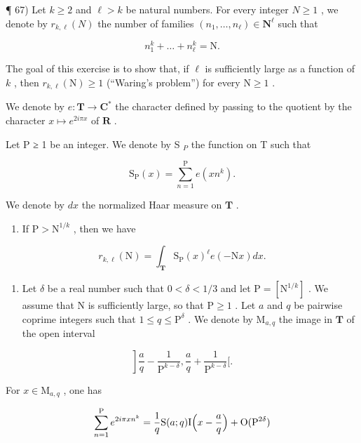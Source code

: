¶ 67) Let \(k \geqslant 2\) and \(\ell > k\) be natural numbers. For every integer \(N \geqslant 1\) , we denote by \(r_{k,\ell}(N)\) the number of families \((n_1, \ldots, n_\ell) \in \mathbf{N}^\ell\) such that

\[
n _ {1} ^ {k} + \dots + n _ {\ell} ^ {k} = \mathrm{N}.
\]

The goal of this exercise is to show that, if \(\ell\) is sufficiently large as a function of \(k\) , then \(r_{k,\ell}(\mathrm{N}) \geqslant 1\) (“Waring's problem”) for every \(\mathrm{N} \geqslant 1\) .

We denote by \(e\colon\mathbf{T}\to\mathbf{C}^{*}\) the character defined by passing to the quotient by the character \(x\mapsto e^{2i\pi x}\) of \(\mathbf{R}\) .

Let P ≥ 1 be an integer. We denote by S \(_{P}\) the function on T such that

\[
\mathrm{S} _ {\mathrm{P}} (x) = \sum_ {n = 1} ^ {\mathrm{P}} e (x n ^ {k}).
\]

We denote by \(dx\) the normalized Haar measure on \(\mathbf{T}\) .

\begin{enumerate}
\def\labelenumi{\alph{enumi})}
\tightlist
\item
  If \(\mathrm{P} > \mathrm{N}^{1 / k}\) , then we have
\end{enumerate}

\[
r _ {k, \ell} (\mathrm{N}) = \int_ {\mathbf {T}} \mathrm{S} _ {\mathrm{P}} (x) ^ {\ell} e (- \mathrm{N} x) d x.
\]

\begin{enumerate}
\def\labelenumi{\alph{enumi})}
\setcounter{enumi}{1}
\tightlist
\item
  Let \(\delta\) be a real number such that \(0 < \delta < 1/3\) and let \(\mathrm{P} = [\mathrm{N}^{1/k}]\) . We assume that N is sufficiently large, so that \(\mathrm{P} \geqslant 1\) . Let \(a\) and \(q\) be pairwise coprime integers such that \(1 \leqslant q \leqslant \mathrm{P}^{\delta}\) . We denote by \(\mathrm{M}_{a,q}\) the image in \(\mathbf{T}\) of the open interval
\end{enumerate}

\[
\left. \right] \frac {a}{q} - \frac {1}{\mathrm{P} ^ {k - \delta}}, \frac {a}{q} + \frac {1}{\mathrm{P} ^ {k - \delta}} \Big [.
\]

For \(x\in \mathrm{M}_{a,q}\) , one has

\[
\sum_ {n = 1} ^ {\mathrm{P}} e ^ {2 i \pi x n ^ {k}} = \frac {1}{q} \mathrm{S} (a; q) \mathrm{I} \Bigl (x - \frac {a}{q} \Bigr) + \mathrm{O} (\mathrm{P} ^ {2 \delta})
\]

